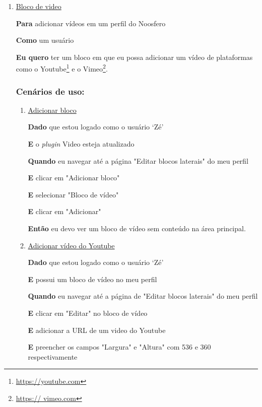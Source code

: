 \begin{enumerate}

\item \underline{Bloco de video}

\textbf{Para} adicionar vídeos em um perfil do Noosfero

\textbf{Como} um usuário

\textbf{Eu quero} ter um bloco em que eu possa adicionar um vídeo de plataformas
como o Youtube\footnote{\url{https://youtube.com}} e o Vimeo\footnote{\url{https://
vimeo.com}}.

\subsubsection*{Cenários de uso:}

\begin{enumerate}

\item \underline{Adicionar bloco}

\textbf{Dado} que estou logado como o usuário `Zé'

\textbf{E} o \textit{plugin} Video esteja atualizado

\textbf{Quando} eu navegar até a página "Editar blocos laterais" do meu perfil

\textbf{E} clicar em "Adicionar bloco"

\textbf{E} selecionar "Bloco de vídeo"

\textbf{E} clicar em "Adicionar"

\textbf{Então} eu devo ver um bloco de vídeo sem conteúdo na área principal.


\item \underline{Adicionar vídeo do Youtube}

\textbf{Dado} que estou logado como o usuário `Zé'

\textbf{E} possui um bloco de vídeo no meu perfil

\textbf{Quando} eu navegar até a página de "Editar blocos laterais" do meu perfil

\textbf{E} clicar em "Editar" no bloco de vídeo

\textbf{E} adicionar a URL de um video do Youtube

\textbf{E} preencher os campos "Largura" e "Altura" com 536 e 360
respectivamente


\end{enumerate}
\end{enumerate}
